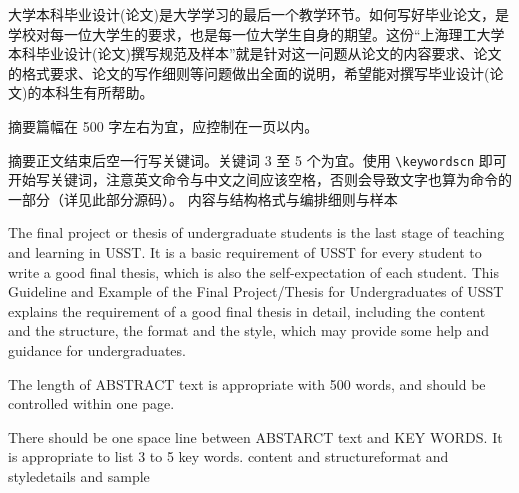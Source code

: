 \abstractcn 
大学本科毕业设计(论文)是大学学习的最后一个教学环节。如何写好毕业论文，是学校对每一位大学生的要求，也是每一位大学生自身的期望。这份“上海理工大学本科毕业设计(论文)撰写规范及样本”就是针对这一问题从论文的内容要求、论文的格式要求、论文的写作细则等问题做出全面的说明，希望能对撰写毕业设计(论文)的本科生有所帮助。

摘要篇幅在 500 字左右为宜，应控制在一页以内。

摘要正文结束后空一行写关键词。关键词 3 至 5 个为宜。使用 \lstinline|\keywordscn| 即可开始写关键词，注意英文命令与中文之间应该空格，否则会导致文字也算为命令的一部分（详见此部分源码）。
\keywordscn 内容与结构\quad 格式与编排\quad 细则与样本
\abstracten
\par The final project or thesis of undergraduate students is the last stage of teaching and learning in USST. It is a basic requirement of USST for every student to write a good final thesis, which is also the self-expectation of each student. This Guideline and Example of the Final Project/Thesis for Undergraduates of USST explains the requirement of a good final thesis in detail, including the content and the structure, the format and the style, which
may provide some help and guidance for undergraduates.
\par The length of ABSTRACT text is appropriate with 500 words, and should be controlled within one page.
\par There should be one space line between ABSTARCT text and KEY WORDS. It is
appropriate to list 3 to 5 key words.
\keywordsen content and structure\quad format and style\quad details and sample